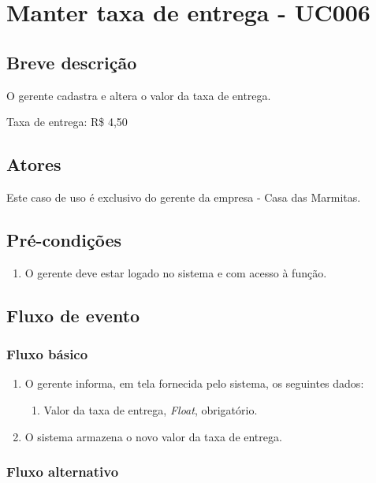 \chapter{Manter taxa de entrega - UC006} \label{uc006}

\section{Breve descrição}

O gerente cadastra e altera o valor da taxa de entrega.

Taxa de entrega: R\$ 4,50

\section{Atores}

Este caso de uso é exclusivo do gerente da empresa - Casa das Marmitas.

\section{Pré-condições}

\begin{enumerate}
	\item O gerente deve estar logado no sistema e com acesso à função.
\end{enumerate}

\section{Fluxo de evento}

\subsection{Fluxo básico}

\begin{enumerate}
	\item O gerente informa, em tela fornecida pelo sistema, os seguintes dados:
	\begin{enumerate}
		\item Valor da taxa de entrega, \emph{Float}, obrigatório.
	\end{enumerate}
	\item O sistema armazena o novo valor da taxa de entrega.
\end{enumerate}

\subsection{Fluxo alternativo}

